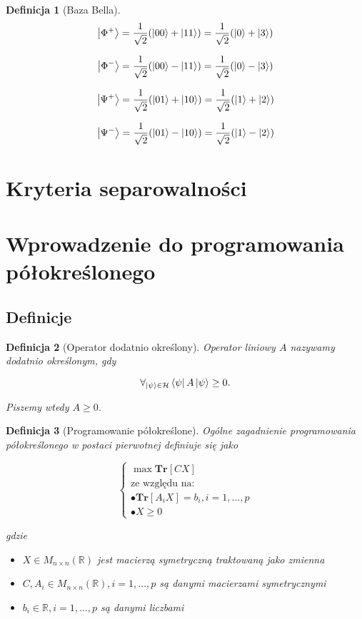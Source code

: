 \documentclass[a4paper,12pt]{article}
\newtheorem{definition}{Definicja}
\begin{document}
\begin{definition}[Baza Bella]
    $$
        \ket{\Phi ^ {+}} = \frac{1}{\sqrt{2}} (\ket{00} + \ket{11}) = \frac{1}{\sqrt{2}} (\ket{0} + \ket{3})
    $$

    $$
        \ket{\Phi ^ {-}} = \frac{1}{\sqrt{2}} (\ket{00} - \ket{11}) = \frac{1}{\sqrt{2}} (\ket{0} - \ket{3})
    $$

    $$
        \ket{\Psi ^ {+}} = \frac{1}{\sqrt{2}} (\ket{01} + \ket{10}) = \frac{1}{\sqrt{2}} (\ket{1} + \ket{2})
    $$

    $$
        \ket{\Psi ^ {-}} = \frac{1}{\sqrt{2}} (\ket{01} - \ket{10}) = \frac{1}{\sqrt{2}} (\ket{1} - \ket{2})
    $$
\end{definition}

\section{Kryteria separowalności}

\section{Wprowadzenie do programowania półokreślonego}

\subsection{Definicje}

\begin{definition}[Operator dodatnio określony]
    Operator liniowy $A$ nazywamy dodatnio określonym, gdy 

    $$
        \forall_{\ket{\psi} \in \mathcal{H}} \bra{\psi} A \ket{\psi} \geq 0.
    $$

    Piszemy wtedy $A \geq 0$.
\end{definition}

\begin{definition}[Programowanie półokreślone]
    Ogólne zagadnienie programowania półokreślonego w postaci pierwotnej definiuje się jako

    $$
        \begin{cases}
            \max \textbf{Tr}[CX] \\
            \text{ze względu na:} \\
            \bullet \textbf{Tr}[A_{i} X] = b_{i}, i = 1, \ldots, p \\
            \bullet X \geq 0
        \end{cases}
    $$

    gdzie

    \begin{itemize}
        \item $X \in M_{n \times n}(\mathbb{R})$ jest macierzą symetryczną traktowaną jako zmienna
        \item $C, A_{i} \in M_{n \times n}(\mathbb{R}), i = 1, \ldots , p$ są danymi macierzami symetrycznymi
        \item $b_{i} \in \mathbb{R}, i = 1, \ldots, p$ są danymi liczbami
    \end{itemize}
\end{definition}
\end{document}

